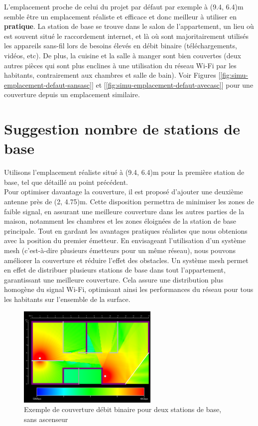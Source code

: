 L'emplacement proche de celui du projet par défaut par exemple à (9.4, 6.4)m semble être un emplacement réaliste et efficace et donc meilleur à utiliser en \textbf{pratique}. La station de base se trouve dans le salon de l'appartement, un lieu où est souvent situé le raccordement internet, et là où sont majoritairement utilisés les appareils sans-fil lors de besoins élevés en débit binaire (téléchargements, vidéos, etc). De plus, la cuisine et la salle à manger sont bien couvertes (deux autres pièces qui sont plus enclines à une utilisation du réseau Wi-Fi par les habitants, contrairement aux chambres et salle de bain). Voir Figures [\ref{fig:simu-emplacement-defaut-sansasc}] et [\ref{fig:simu-emplacement-defaut-avecasc}] pour une couverture depuis un emplacement similaire.\\


\section{Suggestion nombre de stations de base}
Utilisons l'emplacement réaliste situé à (9.4, 6.4)m pour la première station de base, tel que détaillé au point précédent.\\

Pour optimiser davantage la couverture, il est proposé d'ajouter une deuxième antenne près de (2, 4.75)m. Cette disposition permettra de minimiser les zones de faible signal, en assurant une meilleure couverture dans les autres parties de la maison, notamment les chambres et les zones éloignées de la station de base principale. Tout en gardant les avantages pratiques réalistes que nous obtenions avec la position du premier émetteur.
En envisageant l'utilisation d'un système mesh (c'est-à-dire plusieurs émetteurs pour un même réseau), nous pouvons améliorer la couverture et réduire l'effet des obstacles. Un système mesh permet en effet de distribuer plusieurs stations de base dans tout l'appartement, garantissant une meilleure couverture. Cela assure une distribution plus homogène du signal Wi-Fi, optimisant ainsi les performances du réseau pour tous les habitants sur l'ensemble de la surface.


\begin{figure}[H]
    \centering
    \includegraphics[width=0.6\textwidth]{latex/images/multiple-tx-highres-without-lift.png}
    \caption{Exemple de couverture débit binaire pour deux stations de base, sans ascenseur}
    \label{fig:simu-two-tx-without-lift}
\end{figure}

